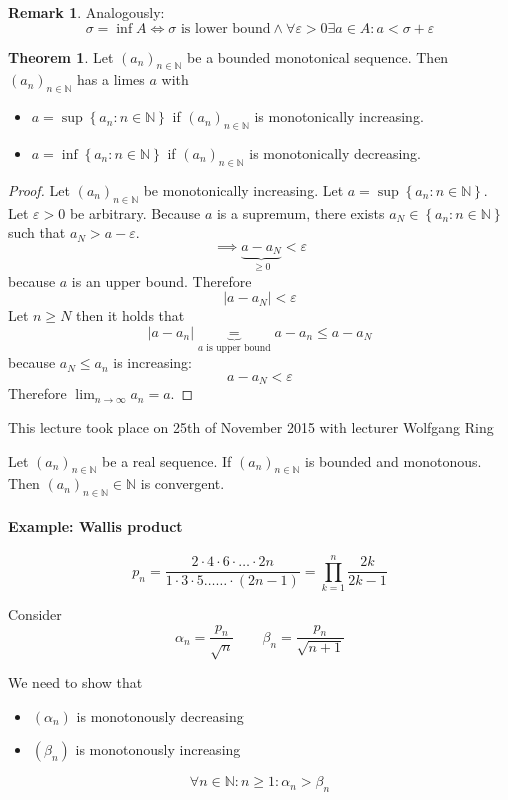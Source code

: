 \documentclass[a4paper,landscape,twocolumn]{article}
\theoremstyle{definition}
\newtheorem{theorem}{Theorem}
\newtheorem{rem}{Remark}
\newcommand\set[1]{\left\{#1\right\}}
\newcommand\abs[1]{\left|#1\right|}
\newcommand\seq[1]{{\left(#1\right)}_{n \in \mathbb N}}
\newcommand\meta[3]{\begin{mdframed}[skipbelow=4pt,skipabove=4pt,innermargin=1pt,innerleftmargin=1pt,innerrightmargin=1pt]\begin{center}\small{\textdownarrow{} This #1 took place on #2 with lecturer #3}\end{center}\end{mdframed}}
\begin{document}
\begin{rem}
  Analogously:
  \[ \sigma = \inf{A} \iff \sigma \text{ is lower bound} \land \forall \varepsilon > 0 \exists a \in A: a < \sigma + \varepsilon \]
\end{rem}

\begin{theorem}
  \label{monotonic-in-R}
  Let $(a_n)_{n \in \mathbb N}$ be a bounded monotonical sequence.
  Then $\seq{a_n}$ has a limes $a$ with
  \begin{itemize}
    \item $a = \sup\set{a_n: n \in \mathbb N}$ if $\seq{a_n}$ is monotonically increasing.
    \item $a = \inf\set{a_n: n \in \mathbb N}$ if $\seq{a_n}$ is monotonically decreasing.
  \end{itemize}
\end{theorem}

\begin{proof}
  Let $\seq{a_n}$ be monotonically increasing. Let $a = \sup\set{a_n: n \in \mathbb N}$.
  Let $\varepsilon > 0$ be arbitrary. Because $a$ is a supremum, there exists $a_N \in \set{a_n: n \in \mathbb N}$
  such that $a_N > a - \varepsilon$.
  \[ \implies \underbrace{a - a_N}_{\geq 0} < \varepsilon \]
  because $a$ is an upper bound. Therefore
  \[ \abs{a - a_N} < \varepsilon \]
  Let $n \geq N$ then it holds that
  \[ \abs{a - a_n} \underbrace{=}_{a \text{ is upper bound}} a - a_n \leq a - a_N \]
  because $a_N \leq a_n$ is increasing:
  \[ a - a_N < \varepsilon \]
  Therefore $\lim_{n \to \infty} a_n = a$.
\end{proof}

\meta{lecture}{25th of November 2015}{Wolfgang Ring}

Let $\seq{a_n}$ be a real sequence.
If $\seq{a_n}$ is bounded and monotonous.
Then $\seq{a_n} \in \mathbb N$ is convergent.

\paragraph{Example: Wallis product}


\[
    p_n
    = \frac{2 \cdot 4 \cdot 6 \cdot \ldots \cdot 2n}{1 \cdot 3 \cdot 5 \dots \ldots \cdot (2n-1)}
    = \prod_{k=1}^n \frac{2k}{2k-1}
\]

Consider
\[ \alpha_n = \frac{p_n}{\sqrt{n}} \qquad \beta_n = \frac{p_n}{\sqrt{n+1}} \]

We need to show that
\begin{itemize}
  \item $(\alpha_n)$ is monotonously decreasing
  \item $(\beta_n)$ is monotonously increasing
\end{itemize}
\[ \forall n \in \mathbb N: n \geq 1: \alpha_n > \beta_n \]
\end{document}
